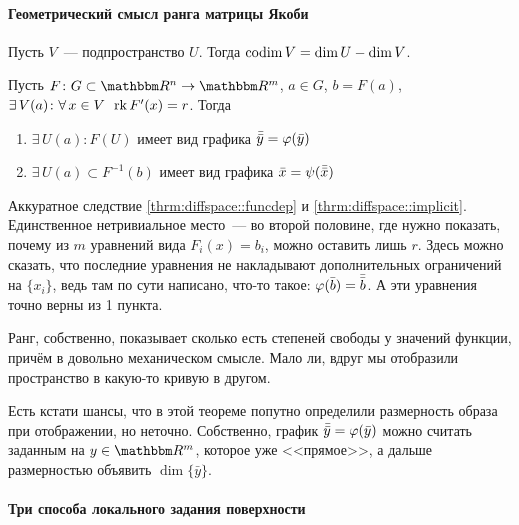 \documentclass[12pt,timbord]{../../../notes}
\begin{document}
\newcommand\bbar[1]{\ensuremath\bar{\bar{#1}}}

\paragraph{Геометрический смысл ранга матрицы Якоби}
\label{par:diffspace::geomjacob}
\begin{defn}[Коразмерность]\label{defn:diffspace::geomjacob::codim}
  Пусть $V$~--- подпространство $U$. Тогда $\operatorname{codim} V = \dim U - \dim V$.
\end{defn}
\begin{thrm}\label{thrm:diffspace::geomjacob}
  Пусть $F \colon G \subset \R^n \to \R^m$, $a\in G$, $b = F(a)$,
  $\exists\, V(a) \colon \forall\, x\in V \;\:\operatorname{rk} F'(x) = r$.
  Тогда 
  \begin{enumerate}
    \item $\exists\, U(a)\colon F(U)$ имеет вид графика $\bbar y = \varphi(\bar y)$
    \item $\exists\, U(a)\subset F^{-1}(b)$ имеет вид графика $\bar x = \psi(\bbar x)$
  \end{enumerate}
\end{thrm}
\begin{ittproof}
  Аккуратное следствие \ref{thrm:diffspace::funcdep} и \ref{thrm:diffspace::implicit}.
  Единственное нетривиальное место~--- во второй половине, где нужно показать, почему из $m$
  уравнений вида $F_i(x)=b_i$, можно оставить лишь $r$. Здесь можно сказать, что последние
  уравнения не накладывают дополнительных ограничений на $\{x_i\}$, ведь там по сути написано,
  что-то такое: $\varphi(\bar b) = \bbar b$. А эти уравнения точно верны из 1 пункта.  
\end{ittproof}
\begin{rem*}
  Ранг, собственно, показывает сколько есть степеней свободы у значений функции, причём в
  довольно механическом смысле.
  Мало ли, вдруг мы отобразили пространство в какую-то кривую в другом.
  
  Есть кстати шансы, что в этой теореме попутно определили размерность образа при отображении, но
  неточно. Собственно, график $\bbar y =  \varphi(\bar y)$ можно считать заданным на $y\in \R^m$,
  которое уже <<прямое>>, а дальше размерностью объявить $\dim \{\bar y\}$.
\end{rem*}

\paragraph{Три способа локального задания поверхности}
\label{par:diffspace::locsurfeqs}
\end{document}
